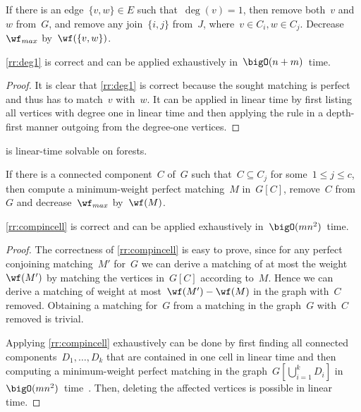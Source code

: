 \begin{rrule}\label{rr:deg1}
  If there is an edge~$\{v, w\} \in E$ such that~$\deg(v)=1$, then remove both~$v$ and~$w$ from~$G$, and remove any join~$\{i, j\}$ from~$J$, where~$v\in C_i, w\in C_j$. Decrease~$\wf_{max}$ by~$\wf(\{v, w\})$.
\end{rrule}
\begin{observation}\label{obs:deg1runtime}
  \autoref{rr:deg1} is correct and can be applied exhaustively in~$\bigO(n + m)$~time.
\end{observation}
\begin{proof}
  It is clear that \autoref{rr:deg1} is correct because the sought matching is perfect and thus has to match~$v$ with~$w$. It can be applied in linear time by first listing all vertices with degree one in linear time and then applying the rule in a depth-first manner outgoing from the degree-one vertices.
\end{proof}
\begin{corollary}\label{cor:cbmlintimeonforests}
  \pCBMs{} is linear-time solvable on forests.
\end{corollary}
\begin{rrule}\label{rr:compincell}
  If there is a connected component~$C$ of~$G$ such that~$C \subseteq C_j$ for some~$1 \leq j \leq c$, then compute a minimum-weight perfect matching~$M$ in~$G[C]$, remove~$C$ from~$G$ and decrease~$\wf_{max}$ by~$\wf(M)$.
\end{rrule}
\begin{observation}\label{obs:compincellruntime}
  \autoref{rr:compincell} is correct and can be applied exhaustively in~$\bigO(mn^2)$~time.
\end{observation}
\begin{proof}
  The correctness of \autoref{rr:compincell} is easy to prove, since for any perfect conjoining matching~$M'$ for~$G$ we can derive a matching of at most the weight~$\wf(M')$ by matching the vertices in~$G[C]$ according to~$M$. Hence we can derive a matching of weight at most~$ \wf(M') - \wf(M)$ in the graph with~$C$ removed. Obtaining a matching for~$G$ from a matching in the graph~$G$ with~$C$ removed is trivial.

  Applying \autoref{rr:compincell} exhaustively can be done by first finding all connected components~$D_1, \ldots, D_k$ that are contained in one cell in linear time and then computing a minimum-weight perfect matching in the graph~$G[\bigcup_{i = 1}^kD_i]$ in~$\bigO(mn^2)$~time~\cite{EK72}. Then, deleting the affected vertices is possible in linear time.
\end{proof}

